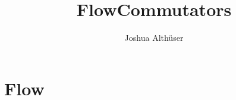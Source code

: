 \documentclass{article}
\title{FlowCommutators}
\author{Joshua Althüser}
\begin{document}
\maketitle

\section{Flow}

\end{document}
